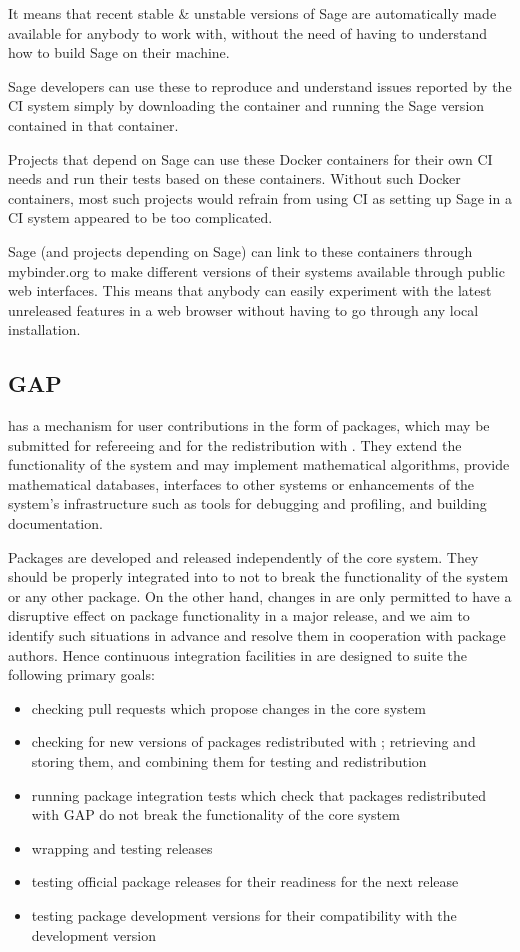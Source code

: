 \documentclass{deliverablereport}
\begin{document}
It means that recent stable \& unstable versions of Sage are automatically made
available for anybody to work with, without the need of having to understand
how to build Sage on their machine.

Sage developers can use these to reproduce and understand issues
reported by the CI system simply by downloading the container and running the
Sage version contained in that container.

Projects that depend on Sage can use these Docker containers for their own CI
needs and run their tests based on these containers. Without such Docker
containers, most such projects would refrain from using CI as setting up Sage
in a CI system appeared to be too complicated.

Sage (and projects depending on Sage) can link to these containers through
mybinder.org  to make
different versions of their systems available through public web interfaces.
This means that anybody can easily experiment with the latest unreleased
features in a web browser without having to go through any local installation.

\subsection{GAP}

\GAP has a mechanism for user contributions in the form of packages,
which may be submitted for refereeing and for the redistribution with \GAP.
They extend the functionality of the system and may implement mathematical
algorithms, provide mathematical databases, interfaces to other systems or
enhancements of the system's infrastructure such as tools for debugging
and profiling, and building documentation. 

Packages are developed and released independently of the core \GAP system.
They should be properly integrated into \GAP to not to break the functionality
of the system or any other package. On the other hand, changes in \GAP are only
permitted to have a disruptive effect on package functionality in a major
release, and we aim to identify such situations in advance and resolve them
in cooperation with package authors. Hence continuous integration facilities
in \GAP are designed to suite the following primary goals:
\begin{itemize}
\item checking pull requests which propose changes in the core \GAP system
\item checking for new versions of \GAP packages redistributed with \GAP;
retrieving and storing them, and combining them for testing and redistribution
\item running package integration tests which check that \GAP packages redistributed
with GAP do not break the functionality of the core \GAP system
\item wrapping and testing \GAP releases
\item testing official package releases for their readiness for the next \GAP release
\item testing package development versions for their compatibility with the \GAP development version
\end{itemize}
\end{document}
